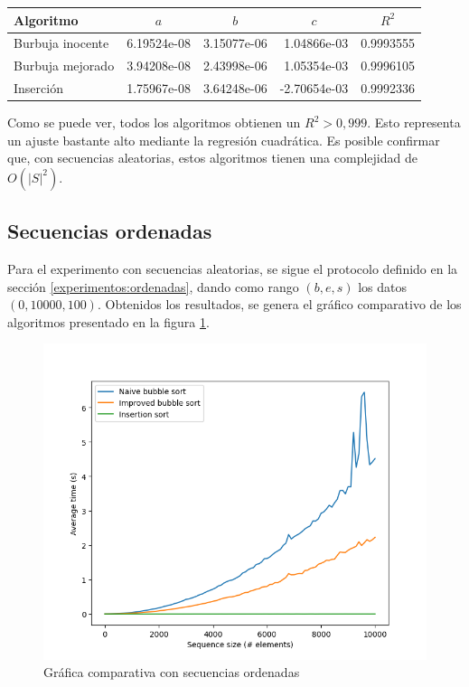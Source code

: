 \documentclass[letter]{article}
\begin{document}
\begin{table}[!ht]
\begin{tabular}{|l|r|r|r|r|}
\hline
Algoritmo        & \multicolumn{1}{c|}{$a$} & \multicolumn{1}{c|}{$b$} & \multicolumn{1}{c|}{$c$} & \multicolumn{1}{c|}{$R^2$} \\ \hline
Burbuja inocente & 6.19524e-08            & 3.15077e-06            & 1.04866e-03            & 0.9993555              \\ \hline
Burbuja mejorado & 3.94208e-08            & 2.43998e-06            & 1.05354e-03            & 0.9996105              \\ \hline
Inserción        & 1.75967e-08            & 3.64248e-06            & -2.70654e-03           & 0.9992336              \\ \hline
\end{tabular}
\end{table}

Como se puede ver, todos los algoritmos obtienen un $R^2 > 0,999$. Esto representa un ajuste bastante alto mediante la regresión cuadrática. Es posible confirmar que, con secuencias aleatorias, estos algoritmos tienen una complejidad de $O(|S|^2)$.

\subsection{Secuencias ordenadas} \label{resultados:ordenadas}

Para el experimento con secuencias aleatorias, se sigue el protocolo definido en la sección \ref{experimentos:ordenadas}, dando como rango $(b,e,s)$ los datos $(0,10000,100)$. Obtenidos los resultados, se genera el gráfico comparativo de los algoritmos presentado en la figura \ref{fig:grafica:ordenadas}.

\vspace{-1em}
\begin{figure}[!htb]
\centering
\includegraphics[scale=0.56]{img/plot_sorted.png}
\vspace{-1em}
\caption{Gráfica comparativa con secuencias ordenadas}
\label{fig:grafica:ordenadas}
\end{figure}
\end{document}
